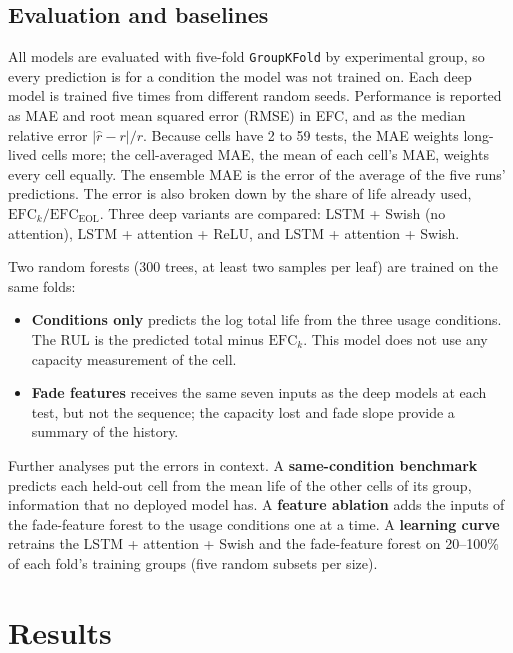 \documentclass[conference]{IEEEtran}
\begin{document}
\subsection{Evaluation and baselines}
\label{sec:eval}
All models are evaluated with five-fold \texttt{GroupKFold} by experimental group, so every prediction is for a condition the model was not trained on. Each deep model is trained five times from different random seeds. Performance is reported as MAE and root mean squared error (RMSE) in EFC, and as the median relative error $|\hat{r}-r|/r$. Because cells have 2 to 59 tests, the MAE weights long-lived cells more; the cell-averaged MAE, the mean of each cell's MAE, weights every cell equally. The ensemble MAE is the error of the average of the five runs' predictions. The error is also broken down by the share of life already used, $\mathrm{EFC}_k / \mathrm{EFC}_{\mathrm{EOL}}$. Three deep variants are compared: LSTM + Swish (no attention), LSTM + attention + ReLU, and LSTM + attention + Swish.

Two random forests \cite{breiman2001} (300 trees, at least two samples per leaf) are trained on the same folds:
\begin{itemize}
\item \textbf{Conditions only} predicts the log total life from the three usage conditions. The RUL is the predicted total minus $\mathrm{EFC}_k$. This model does not use any capacity measurement of the cell.
\item \textbf{Fade features} receives the same seven inputs as the deep models at each test, but not the sequence; the capacity lost and fade slope provide a summary of the history.
\end{itemize}
Further analyses put the errors in context. A \textbf{same-condition benchmark} predicts each held-out cell from the mean life of the other cells of its group, information that no deployed model has. A \textbf{feature ablation} adds the inputs of the fade-feature forest to the usage conditions one at a time. A \textbf{learning curve} retrains the LSTM + attention + Swish and the fade-feature forest on 20--100\% of each fold's training groups (five random subsets per size).


\section{Results}
\label{sec:results}
\end{document}
